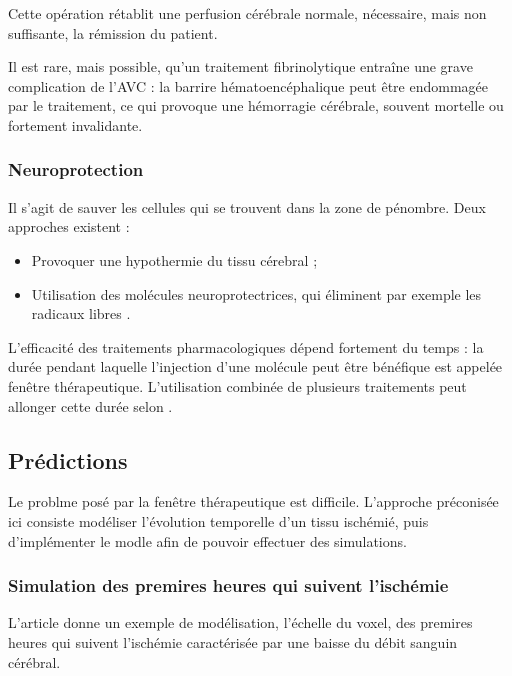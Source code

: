 \par
Cette op\'eration r\'etablit une perfusion c\'er\'ebrale normale, n\'ecessaire, mais non suffisante,  la r\'emission du patient.

\etoile
Il est rare, mais possible, qu'un traitement fibrinolytique entra\^ine une grave complication de l'AVC : %
la barrire h\'ematoenc\'ephalique peut \^etre endommag\'ee par le traitement, ce qui provoque une h\'emorragie c\'er\'ebrale, %
souvent mortelle ou fortement invalidante.

\subsubsection{Neuroprotection}

Il s'agit de sauver les cellules qui se trouvent dans la zone de p\'enombre. Deux approches existent :
\begin{itemize}
\item Provoquer une hypothermie du tissu c\'erebral ;
\item Utilisation des mol\'ecules neuroprotectrices, qui \'eliminent par exemple les radicaux libres \cite{Durukan_PBB_07}.
\end{itemize}

L'efficacit\'e des traitements pharmacologiques d\'epend fortement du temps : %
la dur\'ee pendant laquelle l'injection d'une mol\'ecule peut \^etre b\'en\'efique est appel\'ee fen\^etre th\'erapeutique. %
L'utilisation combin\'ee de plusieurs traitements peut allonger cette dur\'ee selon \cite{Durukan_PBB_07}.

\subsection{Pr\'edictions}

Le problme pos\'e par la fen\^etre th\'erapeutique est difficile. %
L'approche pr\'econis\'ee ici consiste  mod\'eliser l'\'evolution temporelle d'un tissu isch\'emi\'e, %
puis d'impl\'ementer le modle afin de pouvoir effectuer des simulations.

\subsubsection{Simulation des premires heures qui suivent l'isch\'emie}

L'article \cite{Duval_JCBFM_02} donne un exemple de mod\'elisation,  l'\'echelle du voxel, %
des premires heures qui suivent l'isch\'emie caract\'eris\'ee par une baisse du d\'ebit sanguin c\'er\'ebral.

